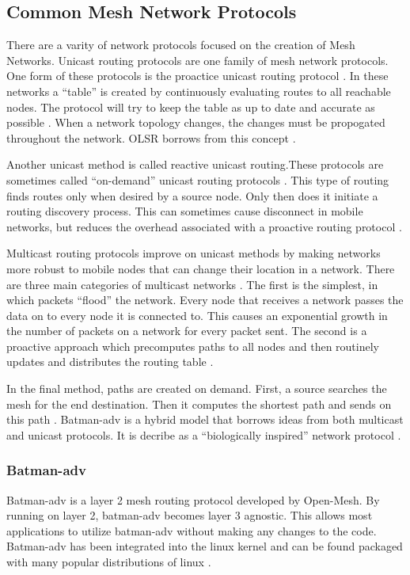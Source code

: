 \subsection{Common Mesh Network Protocols}

There are a varity of network protocols focused on the creation of Mesh Networks. Unicast routing protocols are one family of mesh network protocols. One form of these protocols is the proactice unicast routing protocol \cite{4796928}. In these networks a ``table'' is created by continuously evaluating routes to all reachable nodes. The protocol will try to keep the table as up to date and accurate as possible \cite{4796928}. When a network topology changes, the changes must be propogated throughout the network. OLSR borrows from this concept \cite{0033} \cite{5375690}. 

Another unicast method is called reactive unicast routing.These protocols are sometimes called ``on-demand'' unicast routing protocols \cite{4796928}. This type of routing finds routes only when desired by a source node. Only then does it initiate a routing discovery process. This can sometimes cause disconnect in mobile networks, but reduces the overhead associated with a proactive routing protocol \cite{0033}.

Multicast routing protocols improve on unicast methods by making networks more robust to mobile nodes that can change their location in a network. There are three main categories of multicast networks \cite{4796928}. The first is the simplest, in which packets ``flood'' the network. Every node that receives a network passes the data on to every node it is connected to. This causes an exponential growth in the number of packets on a network for every packet sent. The second is a proactive approach which precomputes paths to all nodes and then routinely updates and distributes the routing table \cite{4796928}.

In the final method, paths are created on demand. First, a source searches the mesh for the end destination. Then it computes the shortest path and sends on this path \cite{4796928}. Batman-adv is a hybrid model that borrows ideas from both multicast and unicast protocols. It is decribe as a ``biologically inspired'' network protocol \cite{0033}.  

\subsubsection{Batman-adv}

Batman-adv is a layer 2 mesh routing protocol developed by Open-Mesh. By running on layer 2, batman-adv becomes layer 3 agnostic. This allows most applications to utilize batman-adv without making any changes to the code. Batman-adv has been integrated into the linux kernel and can be found packaged with many popular distributions of linux \cite{5375690}. 

